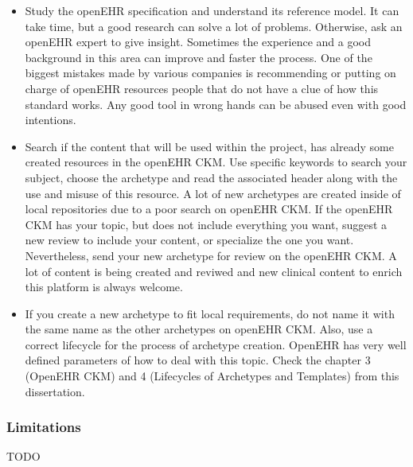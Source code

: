 \documentclass[mim_thesis.tex]{subfiles}
\begin{document}
\begin{itemize}
\item Study the openEHR specification and understand its reference model. It can take time, but a good research can solve a lot of problems. Otherwise, ask an openEHR expert to give insight. Sometimes the experience and a good background in this area can improve and faster the process. One of the biggest mistakes made by various companies is recommending or putting on charge of openEHR resources people that do not have a clue of how this standard works. Any good tool in wrong hands can be abused even with good intentions.

\item Search if the content that will be used within the project, has already some created resources in the openEHR CKM. Use specific keywords to search your subject, choose the archetype and read the associated header along with the use and misuse of this resource. A lot of new archetypes are created inside of local repositories due to a poor search on openEHR CKM. If the openEHR CKM has your topic, but does not include everything you want, suggest a new review to include your content, or specialize the one you want. Nevertheless, send your new archetype for review on the openEHR CKM. A lot of content is being created and reviwed and new clinical content to enrich this platform is always welcome. 

\item If you create a new archetype to fit local requirements, do not name it with the same name as the other archetypes on openEHR CKM. Also, use a correct lifecycle for the process of archetype creation. OpenEHR has very well defined parameters of how to deal with this topic. Check the chapter 3 (OpenEHR CKM) and 4 (Lifecycles of Archetypes and Templates) from this dissertation.  



\end{itemize}   

\subsubsection{Limitations}
TODO
\end{document}
